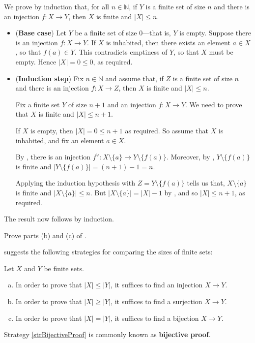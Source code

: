 \begin{cproof}[of (a)]
\item We prove by induction that, for all $n \in \mathbb{N}$, if $Y$ is a finite set of size $n$ and there is an injection $f : X \to Y$, then $X$ is finite and $|X| \le n$.

\begin{itemize}
\item (\textbf{Base case}) Let $Y$ be a finite set of size $0$---that is, $Y$ is empty. Suppose there is an injection $f : X \to Y$. If $X$ is inhabited, then there exists an element $a \in X$, so that $f(a) \in Y$. This contradicts emptiness of $Y$, so that $X$ must be empty. Hence $|X| = 0 \le 0$, as required.

\item (\textbf{Induction step}) Fix $n \in \mathbb{N}$ and assume that, if $Z$ is a finite set of size $n$ and there is an injection $f : X \to Z$, then $X$ is finite and $|X| \le n$.

Fix a finite set $Y$ of size $n+1$ and an injection $f : X \to Y$. We need to prove that $X$ is finite and $|X| \le n+1$.

If $X$ is empty, then $|X| = 0 \le n+1$ as required. So assume that $X$ is inhabited, and fix an element $a \in X$.

By , there is an injection $f^{\vee} : X \setminus \{ a \} \to Y \setminus \{ f(a) \}$. Moreover, by , $Y \setminus \{ f(a) \}$ is finite and $|Y \setminus \{ f(a) \}| = (n+1) - 1 = n$.

Applying the induction hypothesis with $Z = Y \setminus \{ f(a) \}$ tells us that, $X \setminus \{ a \}$ is finite and $|X \setminus \{ a \}| \le n$. But $|X \setminus \{ a \}| = |X| - 1$ by , and so $|X| \le n+1$, as required.
\end{itemize}

The result now follows by induction.
\end{cproof}

\begin{exercise}
Prove parts (b) and (c) of .
\end{exercise}

 suggests the following strategies for comparing the sizes of finite sets:

\begin{strategy}
\label{strComparingSizesOfFiniteSets}
Let $X$ and $Y$ be finite sets.
\begin{enumerate}[(a)]
\item In order to prove that $|X| \le |Y|$, it suffices to find an injection $X \to Y$.
\item In order to prove that $|X| \ge |Y|$, it suffices to find a surjection $X \to Y$.
\item \label{strBijectiveProof} In order to prove that $|X| = |Y|$, it suffices to find a bijection $X \to Y$.
\end{enumerate}
Strategy \ref{strBijectiveProof} is commonly known as \textbf{bijective proof}.
\end{strategy}


